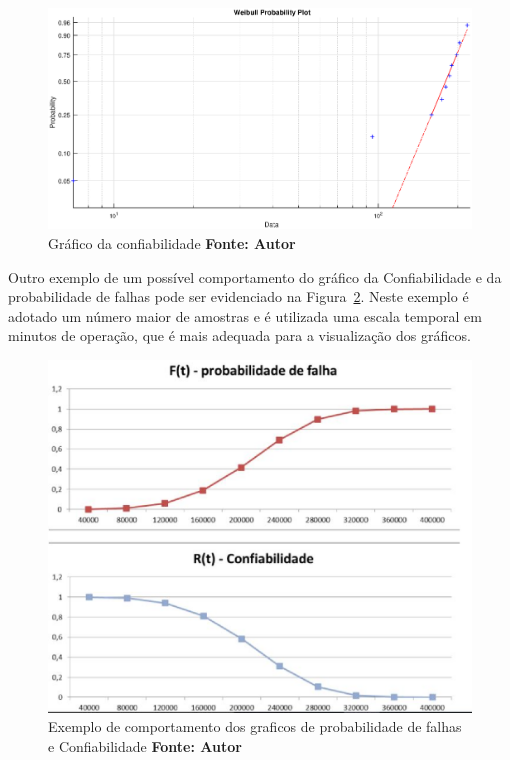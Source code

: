 \graphicspath{{figuras/}}
\begin{figure}[H]
\centering
\includegraphics[width=1.0\textwidth]{grafico_confiabilidade.eps}
\caption{Gráfico da confiabilidade \textbf{Fonte: Autor}}
\label{grafico_confiabilidade}
\end{figure}

Outro exemplo de um possível comportamento do gráfico da Confiabilidade e da probabilidade de falhas pode ser evidenciado na Figura~\ref{graficos_probabilidade_faha_confiabilidade}. Neste exemplo é adotado um número maior de amostras e é utilizada uma escala temporal em minutos de operação, que é mais adequada para a visualização dos gráficos.

\graphicspath{{figuras/}}
\begin{figure}[H]
\centering
\includegraphics[width=1.0\textwidth]{graficos_probabilidade_de_falhas_e_confiabilidade.eps}
\caption{Exemplo de comportamento dos graficos de probabilidade de falhas e Confiabilidade \textbf{Fonte: Autor}}
\label{graficos_probabilidade_faha_confiabilidade}
\end{figure}


